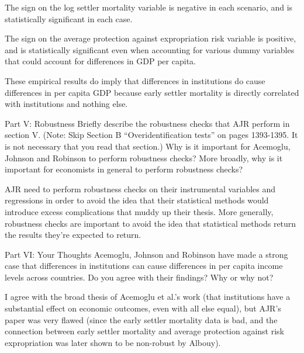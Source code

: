 \documentclass[8pt]{extarticle}
\begin{document}
  \begin{solution}
    \begin{tcolorbox}[colback = white, title = (a)]
      The sign on the log settler mortality variable is negative in each scenario, and is statistically significant in each case.
    \end{tcolorbox}
    \begin{tcolorbox}[colback = white, title = (b)]
      The sign on the average protection against expropriation risk variable is positive, and is statistically significant even when accounting for various dummy variables that could account for differences in GDP per capita.
    \end{tcolorbox}
    \begin{tcolorbox}[colback = white, title = (c)]
      These empirical results do imply that differences in institutions do cause differences in per capita GDP because early settler mortality is directly correlated with institutions and nothing else.
    \end{tcolorbox}
  \end{solution}
  \begin{problem}{Part V: Robustness}
    Briefly describe the robustness checks that AJR perform in section V. (Note: Skip Section B “Overidentification tests” on pages 1393-1395. It is not necessary that you read that section.) Why is it important for Acemoglu, Johnson and Robinson to perform robustness checks? More broadly, why is it important for economists in general to perform robustness checks?
  \end{problem}
  \begin{solution}
    AJR need to perform robustness checks on their instrumental variables and regressions in order to avoid the idea that their statistical methods would introduce excess complications that muddy up their thesis. More generally, robustness checks are important to avoid the idea that statistical methods return the results they're expected to return.
  \end{solution}
  \begin{problem}{Part VI: Your Thoughts}
    Acemoglu, Johnson and Robinson have made a strong case that differences in institutions can cause differences in per capita income levels across countries. Do you agree with their findings? Why or why not?
  \end{problem}
  \begin{solution}
    I agree with the broad thesis of Acemoglu et al.'s work (that institutions have a substantial effect on economic outcomes, even with all else equal), but AJR's paper was very flawed (since the early settler mortality data is bad, and the connection between early settler mortality and average protection against risk expropriation was later shown to be non-robust by Albouy).
  \end{solution}
\end{document}
